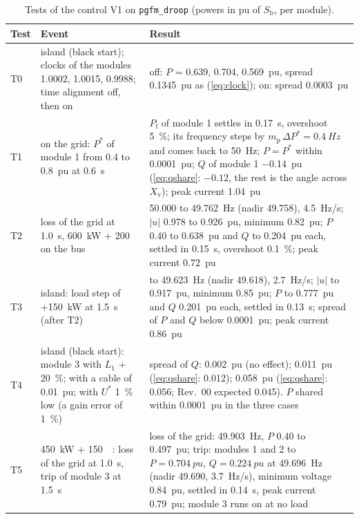 \documentclass[11pt,a4paper]{scrartcl}
\newcommand{\ped}[1]{_{\mathrm{#1}}}
\newcommand{\code}[1]{\texttt{#1}}
\begin{document}
\begin{onehalfspace}
\begin{table}[H]
	\centering
	\captionsetup{width=0.97\textwidth, font=small}
	\caption{Tests of the control V1 on \code{pgfm\_droop} (powers in pu of $S\ped{b}$, per module).}
	\label{tab:tests}
	\footnotesize
	\begin{tabularx}{\textwidth}{@{} l >{\raggedright\arraybackslash}p{} X @{}}
		\toprule
		\textbf{Test} & \textbf{Event} & \textbf{Result} \\
		\midrule
		T0 & island (black start); clocks of the modules \num{1.0002}, \num{1.0015}, \num{0.9988}; time alignment off, then on & off: $P$ = 0.639, 0.704, \SI{0.569}{pu}, spread \SI{0.1345}{pu} as (\ref{eq:clock}); on: spread \SI{0.0003}{pu} \\
		T1 & on the grid: $P^*$ of module 1 from 0.4 to \SI{0.8}{pu} at \SI{0.6}{s} & $P\ped{f}$ of module 1 settles in \SI{0.17}{s}, overshoot \SI{5}{\percent}; its frequency steps by $m\ped{p}\,\Delta P^* = \SI{0.4}{Hz}$ and comes back to \SI{50}{Hz}; $P = P^*$ within \SI{0.0001}{pu}; $Q$ of module 1 \SI{-0.14}{pu} (\ref{eq:qshare}: $-0.12$, the rest is the angle across $X\ped{v}$); peak current \SI{1.04}{pu} \\
		T2 & loss of the grid at \SI{1.0}{s}, \SI{600}{\kilo\watt} + \SI{200}{\kilo\var} on the bus & \num{50.000} to \SI{49.762}{Hz} (nadir 49.758), \SI{4.5}{Hz/s}; $|u|$ 0.978 to \SI{0.926}{pu}, minimum \SI{0.82}{pu}; $P$ 0.40 to \SI{0.638}{pu} and $Q$ to \SI{0.204}{pu} each, settled in \SI{0.15}{s}, overshoot \SI{0.1}{\percent}; peak current \SI{0.72}{pu} \\
		T3 & island: load step of +\SI{150}{\kilo\watt} at \SI{1.5}{s} (after T2) & to \SI{49.623}{Hz} (nadir 49.618), \SI{2.7}{Hz/s}; $|u|$ to \SI{0.917}{pu}, minimum \SI{0.85}{pu}; $P$ to \SI{0.777}{pu} and $Q$ \SI{0.201}{pu} each, settled in \SI{0.13}{s}; spread of $P$ and $Q$ below \SI{0.0001}{pu}; peak current \SI{0.86}{pu} \\
		T4 & island (black start): module 3 with $L_1$ + \SI{20}{\percent}; with a cable of \SI{0.01}{pu}; with $U^*$ \SI{1}{\percent} low (a gain error of \SI{1}{\percent}) & spread of $Q$: \SI{0.002}{pu} (no effect); \SI{0.011}{pu} (\ref{eq:qshare}: 0.012); \SI{0.058}{pu} (\ref{eq:qshare}: 0.056; Rev.~00 expected 0.045). $P$ shared within \SI{0.0001}{pu} in the three cases \\
		T5 & \SI{450}{\kilo\watt} + \SI{150}{\kilo\var}: loss of the grid at \SI{1.0}{s}, trip of module 3 at \SI{1.5}{s} & loss of the grid: \SI{49.903}{Hz}, $P$ 0.40 to \SI{0.497}{pu}; trip: modules 1 and 2 to $P = \SI{0.704}{pu}$, $Q = \SI{0.224}{pu}$ at \SI{49.696}{Hz} (nadir 49.690, \SI{3.7}{Hz/s}), minimum voltage \SI{0.84}{pu}, settled in \SI{0.14}{s}, peak current \SI{0.79}{pu}; module 3 runs on at no load \\

\end{tabularx}
\end{table}
\end{onehalfspace}
\end{document}
